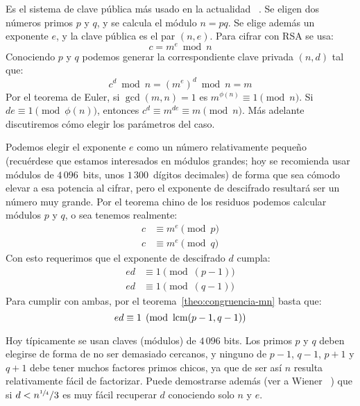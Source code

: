   Es el sistema de clave pública más usado en la actualidad~%
     \cite{rivest78:_RSA}.
  Se eligen dos números primos \(p\) y \(q\),
  y se calcula el módulo \(n = p q\).
  Se elige además un exponente \(e\),
  y la clave pública es el par \((n, e)\).
  Para cifrar con RSA se usa:
  \begin{equation*}
    c = m^e \bmod n
  \end{equation*}
  Conociendo \(p\) y \(q\)
  podemos generar la correspondiente clave privada \((n, d)\)
  tal que:
  \begin{equation*}
    c^d \bmod n
      = \left(m^e\right)^d \bmod n
      = m
  \end{equation*}
  Por el teorema de Euler,
  si \(\gcd(m, n) = 1\)
  es \(m^{\phi(n)} \equiv 1 \pmod{n}\).
  Si \(d e \equiv 1 \pmod{\phi(n)}\),
  entonces \(c^d \equiv m^{d e} \equiv m \pmod{n}\).
  Más adelante discutiremos cómo elegir los parámetros del caso.

  Podemos elegir el exponente \(e\)
  como un número relativamente pequeño
  (recuérdese que estamos interesados en módulos grandes;
   hoy se recomienda usar módulos de \(4\,096\)~bits,
   unos \(1\,300\)~dígitos decimales)
  de forma que sea cómodo elevar a esa potencia al cifrar,%
  pero el exponente de descifrado
  resultará ser un número muy grande.
  Por el teorema chino de los residuos%
  podemos calcular módulos \(p\) y \(q\),
  o sea tenemos realmente:
  \begin{align*}
    c &\equiv m^e \pmod{p} \\
    c &\equiv m^e \pmod{q}
  \end{align*}
  Con esto requerimos que el exponente de descifrado \(d\) cumpla:
  \begin{align*}
    e d
      &\equiv 1 \pmod{(p - 1)} \\
    e d
      &\equiv 1 \pmod{(q - 1)}
  \end{align*}
  Para cumplir con ambas,
  por el teorema~\ref{theo:congruencia-mn}
  basta que:
  \begin{equation*}
    e d \equiv 1 \pmod{\operatorname{lcm}(p - 1, q - 1)}
  \end{equation*}

  Hoy típicamente se usan claves (módulos) de \(4\,096\) bits.
  Los primos \(p\) y \(q\)
  deben elegirse de forma de no ser demasiado cercanos,
  y ninguno de \(p - 1\), \(q - 1\), \(p + 1\) y \(q + 1\)
  debe tener muchos factores primos chicos,
  ya que de ser así \(n\) resulta relativamente fácil de factorizar.
  Puede demostrarse además
  (ver a Wiener~%
    \cite{wiener90:_crypt_short_rsa_secret_exp})
  que si \(d < n^{\sfrac{1}{4}} / 3\)
  es muy fácil recuperar \(d\) conociendo solo \(n\) y \(e\).


